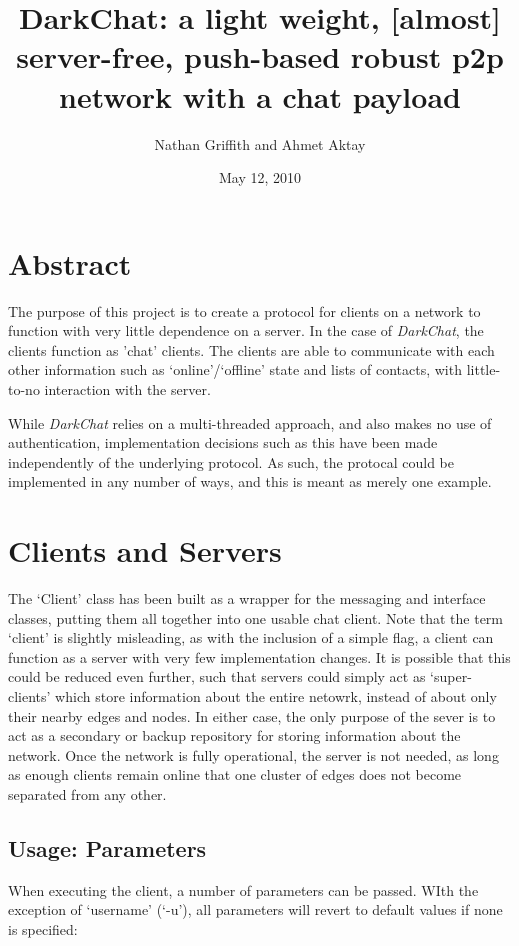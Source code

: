 \documentclass[11pt]{article}
\title{DarkChat: a light weight, [almost] server-free, push-based robust p2p network with a chat payload}
\author{Nathan Griffith and Ahmet Aktay}
\date{May 12, 2010}
\begin{document}
\maketitle %

\section{Abstract}

The purpose of this project is to create a protocol for clients on a network to function with very little dependence on a server. In the case of \emph{DarkChat}, the clients function as 'chat' clients. The clients are able to communicate with each other information such as `online'/`offline' state and lists of contacts, with little-to-no interaction with the server.

While \emph{DarkChat} relies on a multi-threaded approach, and also makes no use of authentication, implementation decisions such as this have been made independently of the underlying protocol. As such, the protocal could be implemented in any number of ways, and this is meant as merely one example.

\section{Clients and Servers}

The `Client' class has been built as a wrapper for the messaging and interface classes, putting them all together into one usable chat client. Note that the term `client' is slightly misleading, as with the inclusion of a simple flag, a client can function as a server with very few implementation changes. It is possible that this could be reduced even further, such that servers could simply act as `super-clients' which store information about the entire netowrk, instead of about only their nearby edges and nodes.
In either case, the only purpose of the sever is to act as a secondary or backup repository for storing information about the network. Once the network is fully operational, the server is not needed, as long as enough clients remain online that one cluster of edges does not become separated from any other.

\subsection{Usage: Parameters}

When executing the client, a number of parameters can be passed. WIth the exception of `username' (`-u'), all parameters will revert to default values if none is specified:
\end{document}
